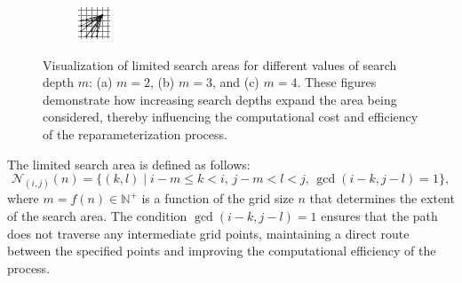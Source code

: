\begin{figure}
\begin{subfigure}{.3\textwidth}
        \caption{}
        \label{fig:dyn-prog-full-disc-search-3}
    \end{subfigure}%
    \begin{subfigure}{.3\textwidth}
        \centering
        \includegraphics[width=\linewidth]{figures/dyn-prog-full-disc-search-4/fig.pdf}
        \caption{}
        \label{fig:dyn-prog-full-disc-search-4}
    \end{subfigure}
    \caption[Search Areas for Fully Discretized Reparameterization]{Visualization of limited search areas for different values of search depth \(m\): (a) \(m = 2\), (b) \(m = 3\), and (c) \(m = 4\). These figures demonstrate how increasing search depths expand the area being considered, thereby influencing the computational cost and efficiency of the reparameterization process.}    
    \label{fig:dyn-prog-full-disc-search}
\end{figure}

The limited search area is defined as follows:
\begin{equation}
    \mathcal{N}_{(i, j)}(n) = \{(k, l) \mid i-m \leq k < i, \, j-m < l < j, \, \gcd(i - k, j - l) = 1\},
    \label{eq:search-area}
\end{equation}
where \(m = f(n) \in \mathbb{N}^+\) is a function of the grid size \(n\) that determines the extent of the search area. The condition \(\gcd(i - k, j - l) = 1\) ensures that the path does not traverse any intermediate grid points, maintaining a direct route between the specified points and improving the computational efficiency of the process.

